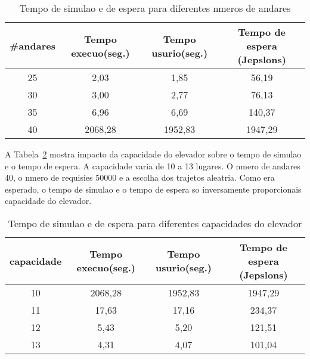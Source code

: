 \documentclass[12pt]{article}
\begin{document}
\begin{table}[ht!]
\centering
\begin{footnotesize}
\begin{tabular}{|c|c|c|c|}
\hline
\textbf{\#andares}              		& \textbf{Tempo execuo(seg.)} & \textbf{Tempo usurio(seg.)}      & \textbf{Tempo de espera (Jepslons)}\\ \hline
25	& 2,03		& 1,85		& 56,19\\ \hline
30	& 3,00		& 2,77		& 76,13\\ \hline
35	& 6,96		& 6,69		& 140,37\\ \hline
40	& 2068,28	& 1952,83	& 1947,29\\ \hline
\end{tabular}
\end{footnotesize}
\caption{Tempo de simulao e de espera para diferentes nmeros de andares \label{tempo_n_andares}}
\end{table}

A Tabela~\ref{tempo_capacidade_elevador} mostra impacto da capacidade do elevador sobre o tempo de simulao e o tempo de espera. A capacidade varia de 10 a 13 lugares. O nmero de andares  40, o nmero de requisies  50000 e a escolha dos trajetos  aleatria. Como era esperado, o tempo de simulao e o tempo de espera so inversamente proporcionais  capacidade do elevador.

\begin{table}[ht!]
\centering
\begin{footnotesize}
\begin{tabular}{|c|c|c|c|}
\hline
\textbf{capacidade}              		& \textbf{Tempo execuo(seg.)} & \textbf{Tempo usurio(seg.)}      & \textbf{Tempo de espera (Jepslons)}\\ \hline
10	& 2068,28	& 1952,83	& 1947,29\\ \hline
11	& 17,63		& 17,16		& 234,37\\ \hline
12	& 5,43		& 5,20		& 121,51\\ \hline
13	& 4,31		& 4,07		& 101,04\\ \hline
\end{tabular}
\end{footnotesize}
\caption{Tempo de simulao e de espera para diferentes capacidades do elevador \label{tempo_capacidade_elevador}}
\end{table}
\end{document}
